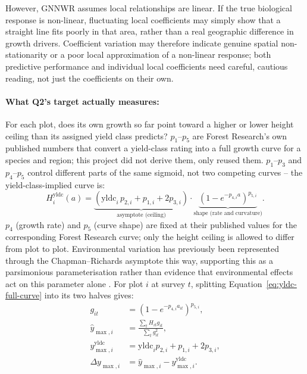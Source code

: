 However, GNNWR assumes local relationships are linear. If the true biological response is non-linear, fluctuating local coefficients may simply show that a straight line fits poorly in that area, rather than a real geographic difference in growth drivers. Coefficient variation may therefore indicate genuine spatial non-stationarity or a poor local approximation of a non-linear response; both predictive performance and individual local coefficients need careful, cautious reading, not just the coefficients on their own.

\paragraph*{What Q2's target actually measures:} For each plot, does its own growth so far point toward a higher or lower height ceiling than its assigned yield class predicts? $p_1$--$p_5$ are Forest Research's own published numbers that convert a yield-class rating into a full growth curve for a species and region; this project did not derive them, only reused them. $p_1$--$p_3$ and $p_4$--$p_5$ control different parts of the same sigmoid, not two competing curves -- the yield-class-implied curve is:
\begin{equation}
H^{\mathrm{yldc}}_i(a) = \underbrace{\left(\mathrm{yldc}_i\, p_{2,i}+p_{1,i}+2p_{3,i}\right)}_{\text{asymptote (ceiling)}} \cdot \underbrace{\left(1-e^{-p_{4,i}a}\right)^{p_{5,i}}}_{\text{shape (rate and curvature)}}.
\label{eq:yldc-full-curve}
\end{equation}
$p_4$ (growth rate) and $p_5$ (curve shape) are fixed at their published values for the corresponding Forest Research curve; only the height ceiling is allowed to differ from plot to plot. Environmental variation has previously been represented through the Chapman--Richards asymptote this way, supporting this as a parsimonious parameterisation rather than evidence that environmental effects act on this parameter alone \cite{scolforo2013Dominant_C2_CR}. For plot $i$ at survey $t$, splitting Equation~\eqref{eq:yldc-full-curve} into its two halves gives:
\begin{align}
g_{it} &= \left(1-e^{-p_{4,i}a_{it}}\right)^{p_{5,i}}, \label{eq:git-curve} \\
\hat y_{\max,i} &= \frac{\sum_t H_{it}g_{it}}{\sum_t g_{it}^2}, \label{eq:plot-ymax-fit} \\
y_{\max,i}^{\mathrm{yldc}} &= \mathrm{yldc}_i p_{2,i}+p_{1,i}+2p_{3,i}, \label{eq:yldc-asymptote} \\
\Delta y_{\max,i} &= \hat y_{\max,i}-y_{\max,i}^{\mathrm{yldc}}. \label{eq:local-ymax-diff}
\end{align}
